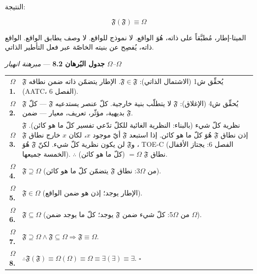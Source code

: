 \documentclass[10pt, openany, oneside]{book}
\renewcommand{\footnotesize}{\fontsize{8.5}{11}\selectfont}
\begin{document}
\vspace{1em}

\noindent النتيجة:

$$\boxed{\mathfrak{F}(\mathfrak{F}) \equiv \Omega}$$

الميتا-إطار، مُطبَّقاً على ذاته، هُوَ الواقع. لا نموذج للواقع. لا وصف يطابق الواقع. الواقع ذاته، يُفصِح عن بنيته الخاصّة عبر فعل التأطير الذاتي.

\vspace{0.5em}

\textbf{جدول البُرهان 8.2} --- \textit{مبرهنة انهيار $\Omega$--$\Omega$}

\vspace{0.5em}

{\footnotesize
\noindent\begin{tabular}{r p{}}
\textbf{$\Omega$1.} & $\mathfrak{F}$ يُحقِّق ش1 (الاشتمال الذاتي): $\mathfrak{F} \in \mathfrak{F}$. الإطار يتضمّن ذاته ضمن نطاقه (AATC، الفصل 6). \\[0.3em]
\textbf{$\Omega$2.} & $\mathfrak{F}$ يُحقِّق ش4 (الإغلاق): $\mathfrak{F}$ لا يتطلّب بنية خارجية. كلّ عنصر يستدعيه $\mathfrak{F}$ --- كلّ بديهية، مؤثّر، تعريف، معيار --- ضمن $\mathfrak{F}$. \\[0.3em]
\textbf{$\Omega$3.} & $\mathfrak{F}$ نظرية كلّ شيء (بالبناء: النظرية الغائية للكلّ تدّعي تفسير كلّ ما هو كائن). إذن نطاق $\mathfrak{F}$ هُوَ كلّ ما هو كائن. إذا استبعد $\mathfrak{F}$ أيّ موجود $x$، لكان $x$ خارج نطاق $\mathfrak{F}$، و$\mathfrak{F}$ لن يكون نظرية كلّ شيء. لكنّ $\mathfrak{F}$ هُوَ TOE-C (الفصل 6: يجتاز الأقفال الخمسة جميعها). $\therefore$ نطاق $\mathfrak{F}$ $= \Omega$ (كلّ ما هو كائن). \\[0.3em]
\textbf{$\Omega$4.} & $\mathfrak{F} \supseteq \Omega$ (من $\Omega$3: نطاق $\mathfrak{F}$ يتضمّن كلّ ما هو كائن). \\[0.3em]
\textbf{$\Omega$5.} & $\mathfrak{F} \in \Omega$ (الإطار يوجد؛ إذن هو ضمن الواقع). \\[0.3em]
\textbf{$\Omega$6.} & $\mathfrak{F} \subseteq \Omega$ (من $\Omega$5: كلّ شيء ضمن $\mathfrak{F}$ يوجد؛ كلّ ما يوجد ضمن $\Omega$). \\[0.3em]
\textbf{$\Omega$7.} & $\mathfrak{F} \supseteq \Omega \wedge \mathfrak{F} \subseteq \Omega \Rightarrow \mathfrak{F} \equiv \Omega$. \\[0.3em]
\textbf{$\Omega$8.} & $\therefore \mathfrak{F}(\mathfrak{F}) \equiv \Omega(\Omega) \equiv \Omega \equiv \exists(\exists) \equiv \exists$. $\square$ \\[0.3em]
\end{tabular}
}
\end{document}
